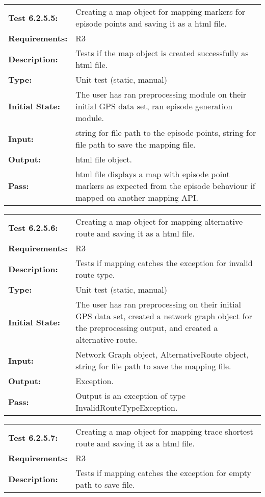 \documentclass[12pt, titlepage]{article}
\begin{document}
{\begin{tabular}{|l|p{10cm}|}
    \hline
    \bf{Test} 6.2.5.5: & Creating a map object for mapping markers for episode points and saving it as a html file.\\
    \bf{Requirements}: &  R3\\
    \bf{Description}: & Tests if the map object is created successfully as html file. \\
    \bf{Type}: & Unit test (static, manual) \\
    \bf{Initial State}: & The user has ran preprocessing module on their initial GPS data set, ran episode generation module. \\
    \bf{Input}: & string for file path to the episode points, string for file path to save the mapping file. \\
    \bf{Output}: & html file object. \\
    \bf{Pass}: & html file displays a map with episode point markers as expected from the episode behaviour if mapped on another mapping API. \\
    \hline
\end{tabular}
\begin{tabular}{|l|p{10cm}|}
    \hline
    \bf{Test} 6.2.5.6: & Creating a map object for mapping alternative route and saving it as a html file.\\
    \bf{Requirements}: &  R3\\
    \bf{Description}: & Tests if mapping catches the exception for invalid route type. \\
    \bf{Type}: & Unit test (static, manual) \\
    \bf{Initial State}: & The user has ran preprocessing on their initial GPS data set, created a network graph object for the preprocessing output, and created a alternative route. \\
    \bf{Input}: & Network Graph object, AlternativeRoute object, string for file path to save the mapping file. \\
    \bf{Output}: & Exception. \\
    \bf{Pass}: & Output is an exception of type InvalidRouteTypeException. \\
    \hline
\end{tabular}
\begin{tabular}{|l|p{10cm}|}
    \hline
    \bf{Test} 6.2.5.7: & Creating a map object for mapping trace shortest route and saving it as a html file.\\
    \bf{Requirements}: &  R3\\
    \bf{Description}: & Tests if mapping catches the exception for empty path to save file. \\

\end{tabular}}
\end{document}
